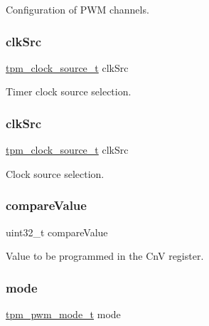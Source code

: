 Configuration of P\+WM channel\textquotesingle{}s. \mbox{\label{group__struct__group_gae714239d1fabd3df000d89beb931051a}} 
\subsubsection{\texorpdfstring{clkSrc}{clkSrc}\hspace{0.1cm}{\footnotesize\ttfamily [1/2]}}
{\footnotesize\ttfamily \mbox{\hyperlink{group__tpm_gac9f0f29f5ff0e39eea892919dc9b50d8}{tpm\+\_\+clock\+\_\+source\+\_\+t}} clk\+Src}

Timer clock source selection. \mbox{\label{group__struct__group_gae714239d1fabd3df000d89beb931051a}} 
\subsubsection{\texorpdfstring{clkSrc}{clkSrc}\hspace{0.1cm}{\footnotesize\ttfamily [2/2]}}
{\footnotesize\ttfamily \mbox{\hyperlink{group__tpm_gac9f0f29f5ff0e39eea892919dc9b50d8}{tpm\+\_\+clock\+\_\+source\+\_\+t}} clk\+Src}

Clock source selection. \mbox{\label{group__struct__group_gae39f1dfd1bc42feaeb879d5d2eb2249b}} 
\subsubsection{\texorpdfstring{compareValue}{compareValue}}
{\footnotesize\ttfamily uint32\+\_\+t compare\+Value}

Value to be programmed in the CnV register. \mbox{\label{group__struct__group_ga4c09362008685312f26edfb50458aad6}} 
\subsubsection{\texorpdfstring{mode}{mode}\hspace{0.1cm}{\footnotesize\ttfamily [1/3]}}
{\footnotesize\ttfamily \mbox{\hyperlink{group__tpm_ga3575f319c9fbc1aa574a1054c14e7dab}{tpm\+\_\+pwm\+\_\+mode\+\_\+t}} mode}

